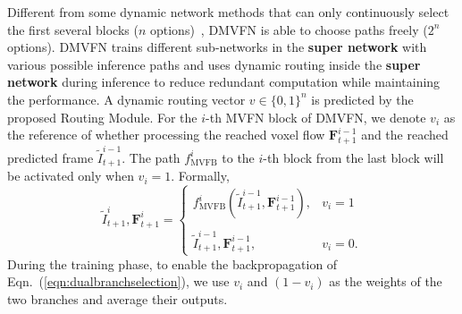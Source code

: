 \documentclass[10pt,twocolumn,letterpaper]{article}
\begin{document}
Different from some dynamic network methods that can only continuously select the first several blocks ($n$ options)~\cite{branchynet,bolukbasi2017adaptive}, DMVFN is able to choose paths freely ($2^{n}$ options). DMVFN trains different sub-networks in the \textbf{super network} with various possible inference paths and uses dynamic routing inside the \textbf{super network} during inference to reduce redundant computation while maintaining the performance. A dynamic routing vector $v \in { \{ 0,1 \} }^{n}$ is predicted by the proposed Routing Module. For the $i$-th MVFN block of DMVFN, we denote $v_i$ as the reference of whether processing the reached voxel flow $\textbf{F}^{i-1}_{t+1}$ and the reached predicted frame $\tilde{I}^{i-1}_{t+1}$. The path $f^i_\mathrm{MVFB}$ to the $i$-th block from the last block will be activated only when $v_i=1$. Formally, 
\begin{equation}
\label{eqn:dualbranchselection}
\tilde{I}^{i}_{t+1},\textbf{F}^{i}_{t+1}=
\begin{cases}
f^i_\mathrm{MVFB}(\tilde{I}^{i-1}_{t+1},\textbf{F}^{i-1}_{t+1}), & v_i=1 \\
\\
\tilde{I}^{i-1}_{t+1},\textbf{F}^{i-1}_{t+1}, & v_i=0.
\end{cases}
\end{equation}
During the training phase, to enable the backpropagation of Eqn.~(\ref{eqn:dualbranchselection}), we use $v_i$ and $(1-v_i)$ as the weights of the two branches and average their outputs.
\end{document}
